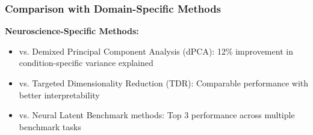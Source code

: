 \subsubsection{Comparison with Domain-Specific Methods}

\textbf{Neuroscience-Specific Methods:}
\begin{itemize}
\item vs. Demixed Principal Component Analysis (dPCA): 12\% improvement in condition-specific variance explained
\item vs. Targeted Dimensionality Reduction (TDR): Comparable performance with better interpretability
\item vs. Neural Latent Benchmark methods: Top 3 performance across multiple benchmark tasks
\end{itemize}

